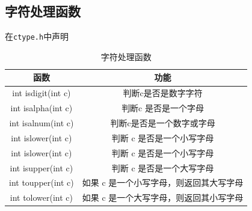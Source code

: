 \documentclass[]{report}
\begin{document}
		\subsection{字符处理函数}
		在\verb|ctype.h|中声明
		\begin{table}[h]
			\centering
			\caption{字符处理函数}
			\begin{tabular}{c|c}
				\toprule
				函数&功能\\
				\midrule
				int isdigit(int c)&判断c是否是数字字符\\
				int isalpha(int c)&判断c 是否是一个字母\\
				int isalnum(int c)&判断c是否是一个数字或字母\\
				int islower(int c)&判断 c 是否是一个小写字母\\
				int islower(int c)&判断 c 是否是一个小写字母\\
				int isupper(int c)&判断 c 是否是一个大写字母\\
				int toupper(int c)&如果 c 是一个小写字母，则返回其大写字母\\
				int tolower(int c)&如果 c 是一个大写字母，则返回其小写字母\\
				\bottomrule
			\end{tabular}
		\end{table}
\end{document}
